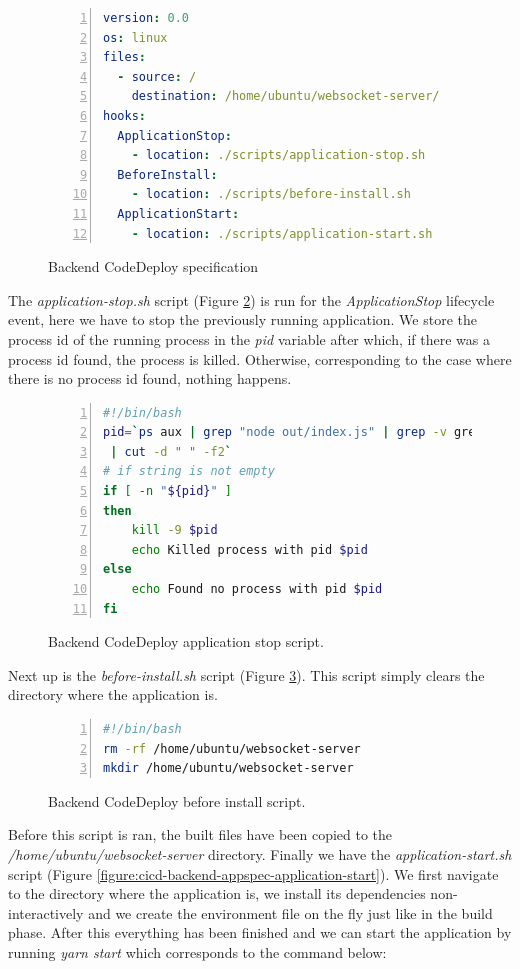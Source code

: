 \begin{figure}[H]
\begin{lstlisting}[numbers=left,language=yaml]
version: 0.0
os: linux
files:
  - source: /
    destination: /home/ubuntu/websocket-server/
hooks:
  ApplicationStop:
    - location: ./scripts/application-stop.sh
  BeforeInstall:
    - location: ./scripts/before-install.sh
  ApplicationStart:
    - location: ./scripts/application-start.sh
\end{lstlisting}
\caption{Backend CodeDeploy specification}
\label{figure:cicd-backend-appspec}
\end{figure}

The \textit{application-stop.sh} script (Figure \ref{figure:cicd-backend-appspec-application-stop}) is run for the \textit{ApplicationStop} lifecycle event, here we have to stop the previously running application. We store the process id of the running process in the \textit{pid} variable after which, if there was a process id found, the process is killed. Otherwise, corresponding to the case where there is no process id found, nothing happens.

\begin{figure}[H]
\begin{lstlisting}[numbers=left,language=bash]
#!/bin/bash
pid=`ps aux | grep "node out/index.js" | grep -v grep | tr -s " " " "
 | cut -d " " -f2`
# if string is not empty
if [ -n "${pid}" ]
then
    kill -9 $pid
    echo Killed process with pid $pid
else
    echo Found no process with pid $pid
fi
\end{lstlisting}
\caption{Backend CodeDeploy application stop script.}
\label{figure:cicd-backend-appspec-application-stop}
\end{figure}

Next up is the \textit{before-install.sh} script (Figure \ref{figure:cicd-backend-appspec-before-install}). This script simply clears the directory where the application is.

\begin{figure}[H]
\begin{lstlisting}[numbers=left,language=bash]
#!/bin/bash
rm -rf /home/ubuntu/websocket-server
mkdir /home/ubuntu/websocket-server
\end{lstlisting}
\caption{Backend CodeDeploy before install script.}
\label{figure:cicd-backend-appspec-before-install}
\end{figure}

Before this script is ran, the built files have been copied to the \textit{/home/ubuntu/websocket-server} directory. Finally we have the \textit{application-start.sh} script (Figure \ref{figure:cicd-backend-appspec-application-start}). We first navigate to the directory where the application is, we install its dependencies non-interactively and we create the environment file on the fly just like in the build phase. After this everything has been finished and we can start the application by running \textit{yarn start} which corresponds to the command below:

